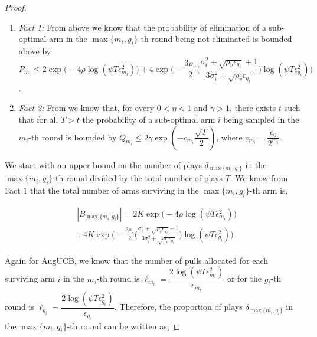 \begin{proof}
  
\begin{enumerate}
\item \emph{Fact 1:} From above we know that the probability of elimination of a sub-optimal arm in the $\max\lbrace m_{i}, g_{i}\rbrace$-th round being not eliminated is bounded above by $P_{m_{i}}\leq 2\exp\bigg(-4\rho\log (\psi T\epsilon_{m_{i}}^{2})\bigg) + 4\exp\bigg(- \dfrac{3\rho_v}{2} \bigg(\dfrac{\sigma_{i}^{2}+\sqrt{\rho_{v}\epsilon_{g_{i}}}+1}{3\sigma_{i}^{2}+\sqrt{\rho_v \epsilon_{g_{i}}}}\bigg) \log(\psi T\epsilon_{g_{i}}^{2}) \bigg)$.
\item \emph{Fact 2:} From \cite{tolpin2012mcts} we know that, for every $0<\eta <1$ and $\gamma > 1$, there exists $t$ such that for all $T>t$ the probability of a sub-optimal arm $i$ being sampled in the $m_{i}$-th round is bounded by $Q_{m_{i}}\leq 2\gamma \exp(-c_{m_{i}}\dfrac{\sqrt{T}}{2})$, where $c_{m_{i}}=\dfrac{c_{0}}{2^{m_{i}}}$.
\end{enumerate}

We start with an upper bound on the number of plays $\delta_{\max\lbrace m_{i}, g_{i}\rbrace}$ in the $\max\lbrace m_{i}, g_{i}\rbrace$-th round divided by the total number of plays $T$. We know  from Fact $1$  that the total number of arms surviving in the $\max\lbrace m_{i}, g_{i}\rbrace$-th arm is, 

\begin{small}
\begin{align*}
&|B_{\max\lbrace m_{i}, g_{i}\rbrace}|=2K\exp\bigg(-4\rho\log (\psi T\epsilon_{m_{i}}^{2})\bigg)\\ 
& + 4K\exp\bigg(- \frac{3\rho_v}{2} \big(\frac{\sigma_{i}^{2}+\sqrt{\rho_{v}\epsilon_{g_{i}}}+1}{3\sigma_{i}^{2}+\sqrt{\rho_v \epsilon_{g_{i}}}}\big) \log(\psi T\epsilon_{g_{i}}^{2}) \bigg)
\end{align*}     
\end{small}


Again for AugUCB, we know that the number of pulls allocated for each surviving arm $i$ in the $m_{i}$-th round is $\ell_{m_{i}}=\dfrac{2\log (\psi T \epsilon_{m_{i}}^{2})}{\epsilon_{m_{i}}}$ or for the $g_{i}$-th round is $\ell_{g_{i}}=\dfrac{2\log (\psi T \epsilon_{g_{i}}^{2})}{\epsilon_{g_{i}}}$. Therefore, the proportion of plays $\delta_{\max\lbrace m_{i}, g_{i}\rbrace}$ in the $\max\lbrace m_{i}, g_{i}\rbrace$-th round can be written as,


\end{proof}
